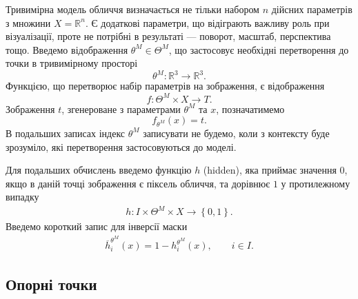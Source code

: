 Тривимірна модель обличчя визначається не тільки набором $n$ дійсних параметрів
з множини $X = \mathbb{R}^n$.
Є додаткові параметри, що відіграють важливу роль при візуалізації,
проте не потрібні в результаті --- поворот, масштаб, перспектива тощо.
Введемо відображення $\theta^M \in \Theta^M$,
що застосовує необхідні перетворення до точки в тривимірному просторі
\begin{equation*}
  \theta^M: \mathbb{R}^3 \rightarrow \mathbb{R}^3.
\end{equation*}
Функцією, що перетворює набір параметрів на зображення, є відображення
\begin{equation*}
  f: \Theta^M \times X \rightarrow T.
\end{equation*}
Зображення $t$, згенероване з параметрами $\theta^M$ та $x$, позначатимемо
\begin{equation*}
  f_{\theta^M} \left( x \right) = t.
\end{equation*}
В подальших записах індекс $\theta^M$ записувати не будемо,
коли з контексту буде зрозуміло, які перетворення застосовуються до моделі.

Для подальших обчислень введемо функцію $h$ (hidden),
яка приймає значення $0$,
якщо в даній точці зображення є піксель обличчя,
та дорівнює $1$ у протилежному випадку
\begin{align*}
  h: I \times \Theta^M \times X \rightarrow \left\{ 0, 1 \right\}.
\end{align*}
Введемо короткий запис для інверсії маски
\begin{align*}
  \overline{h}^{\theta^M}_i\left( x \right)
  = 1 - h^{\theta^M}_i\left( x \right),\qquad
  i \in I.
\end{align*}

\subsection{Опорні точки}

